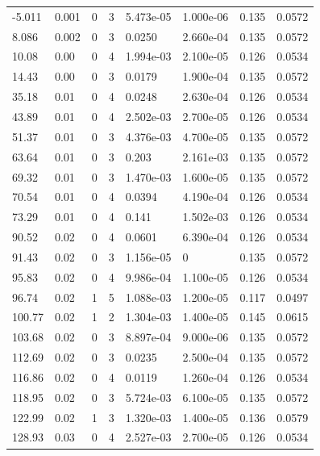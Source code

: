 \documentclass[preview]{standalone}
\begin{document}
{{\begin{tabular}{L{1.2cm}C{1.2cm} C{0.3cm}C{0.5cm} C{1.4cm}C{1.4cm} C{1.4cm}C{1.4cm}}
  -5.011  &  0.001  & 0     &  3 &  5.473e-05  & 1.000e-06  & 0.135 &  0.0572   \\ 
  8.086  &  0.002  & 0     &  3 &  0.0250  & 2.660e-04  & 0.135 &  0.0572   \\ 
  10.08  &  0.00  & 0     &  4 &  1.994e-03  & 2.100e-05  & 0.126 &  0.0534   \\ 
  14.43  &  0.00  & 0     &  3 &  0.0179  & 1.900e-04  & 0.135 &  0.0572   \\ 
  35.18  &  0.01  & 0     &  4 &  0.0248  & 2.630e-04  & 0.126 &  0.0534   \\ 
  43.89  &  0.01  & 0     &  4 &  2.502e-03  & 2.700e-05  & 0.126 &  0.0534   \\ 
  51.37  &  0.01  & 0     &  3 &  4.376e-03  & 4.700e-05  & 0.135 &  0.0572   \\ 
  63.64  &  0.01  & 0     &  3 &  0.203  & 2.161e-03  & 0.135 &  0.0572   \\ 
  69.32  &  0.01  & 0     &  3 &  1.470e-03  & 1.600e-05  & 0.135 &  0.0572   \\ 
  70.54  &  0.01  & 0     &  4 &  0.0394  & 4.190e-04  & 0.126 &  0.0534   \\ 
  73.29  &  0.01  & 0     &  4 &  0.141  & 1.502e-03  & 0.126 &  0.0534   \\ 
  90.52  &  0.02  & 0     &  4 &  0.0601  & 6.390e-04  & 0.126 &  0.0534   \\ 
  91.43  &  0.02  & 0     &  3 &  1.156e-05  & 0  & 0.135 &  0.0572   \\ 
  95.83  &  0.02  & 0     &  4 &  9.986e-04  & 1.100e-05  & 0.126 &  0.0534   \\ 
  96.74  &  0.02  & 1     &  5 &  1.088e-03  & 1.200e-05  & 0.117 &  0.0497   \\ 
  100.77  &  0.02  & 1     &  2 &  1.304e-03  & 1.400e-05  & 0.145 &  0.0615   \\ 
  103.68  &  0.02  & 0     &  3 &  8.897e-04  & 9.000e-06  & 0.135 &  0.0572   \\ 
  112.69  &  0.02  & 0     &  3 &  0.0235  & 2.500e-04  & 0.135 &  0.0572   \\ 
  116.86  &  0.02  & 0     &  4 &  0.0119  & 1.260e-04  & 0.126 &  0.0534   \\ 
  118.95  &  0.02  & 0     &  3 &  5.724e-03  & 6.100e-05  & 0.135 &  0.0572   \\ 
  122.99  &  0.02  & 1     &  3 &  1.320e-03  & 1.400e-05  & 0.136 &  0.0579   \\ 
  128.93  &  0.03  & 0     &  4 &  2.527e-03  & 2.700e-05  & 0.126 &  0.0534   \\ 

\end{tabular}}}
\end{document}
